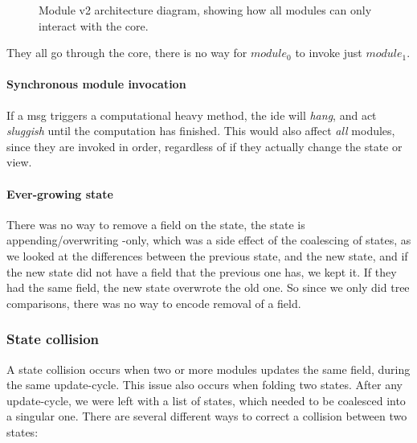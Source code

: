 \begin{figure}[H]
  \centering
  
  \caption{
    Module v2 architecture diagram, showing how all modules can only interact
    with the core.
  }
  \label{fig:modulev2}
\end{figure}

They all go through the core, there is no way for $module_0$ to invoke just
$module_1$.

\paragraph{Synchronous module invocation} If a msg triggers a computational
heavy method, the \gls*{ide} will \textit{hang}, and act \textit{sluggish} until
the computation has finished. This would also affect \textit{all} modules,
since they are invoked in order, regardless of if they actually change the
state or view.

\paragraph{Ever-growing state} There was no way to remove a field on the state,
the state is appending/overwriting -only, which was a side effect of the
coalescing of states, as we looked at the differences between the previous
state, and the new state, and if the new state did not have a field that the
previous one has, we kept it. If they had the same field, the new state
overwrote the old one. So since we only did tree comparisons, there was no way
to encode removal of a field.

\subsubsection{State collision} \label{sec:collision}

A state collision occurs when two or more modules updates the same field, during
the same update-cycle. This issue also occurs when folding two states. After any
update-cycle, we were left with a list of states, which needed to be coalesced
into a singular one. There are several different ways to correct a collision
between two states:

